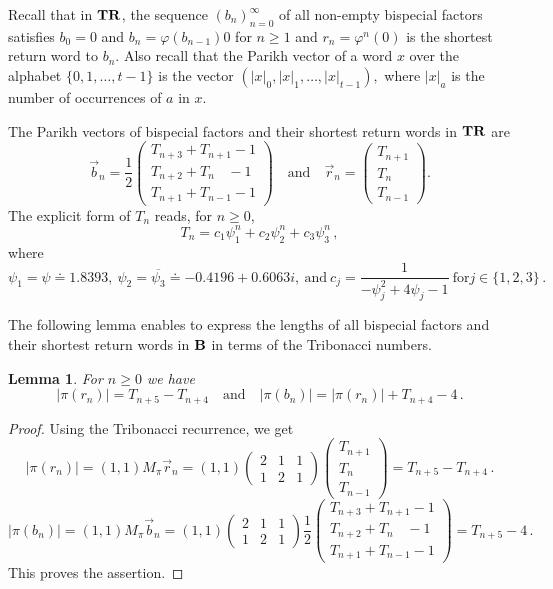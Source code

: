 \documentclass[
final
]{dmtcs-episciences}
\theoremstyle{plain}
\newtheorem{lemma}[theorem]{Lemma}
\theoremstyle{definition}
\theoremstyle{remark}
\begin{document}
Recall that in $\bf TR$, the sequence $(b_n)_{n=0}^{\infty}$ of all non-empty bispecial factors satisfies $b_0=0$ and 
$b_n=\varphi(b_{n-1})0$ for $n\geq 1$ and $r_n=\varphi^n(0)$ is the shortest return word to $b_n$.
Also recall that the Parikh vector of a word $x$ over the alphabet $\{0,1,\ldots, t-1\}$
is the vector
$(|x|_0, |x|_1, \ldots, |x|_{t-1}),$
where $|x|_a$ is the number of occurrences of $a$ in $x$.

The Parikh vectors of bispecial factors and their shortest return words in $\bf TR$ are
\begin{equation}\label{eq: Parikh}
\vec b_n=\frac{1}{2}\left(\begin{array}{c} 
T_{n+3}+T_{n+1}-1\\
T_{n+2}+T_{n\phantom{-1}}-1\\
T_{n+1}+T_{n-1}-1
\end{array}\right) \quad \text{and}\quad \vec r_n=\left(\begin{array}{c} T_{n+1}\\ T_{n\phantom{-1}} \\ T_{n-1}\end{array}\right) . 
\end{equation}
The explicit form of $T_n$ reads, for $n\geq 0$,
\begin{equation}\label{eq: explicit}
T_n=c_1 \psi_1^n+c_2\psi_2^n+c_3\psi_3^n\,,
\end{equation}
where $$\psi_1=\psi\doteq 1.8393, \ \psi_2=\overline{\psi_3}\doteq -0.4196+0.6063i,\ \text{and} \ c_j=\frac{1}{-\psi_j^2+4\psi_j-1}\ \text{for} j\in\{1,2,3\}\,.$$

The following lemma enables to express the lengths of all bispecial factors and their shortest return words in $\bf B$ in terms of the Tribonacci numbers.
\begin{lemma}\label{lem: lengthBS} 
For $n\geq 0$ we have
$$|\pi(r_n)|=T_{n+5}-T_{n+4} \quad \text{and} \quad |\pi(b_n)|=|\pi(r_n)|+T_{n+4}-4\,.$$
\end{lemma}
\begin{proof}
Using the Tribonacci recurrence, we get
$$|\pi(r_n)|=(1,1)M_\pi\vec r_n=(1,1)\left(\begin{array}{rcl} 2&1&1\\ 1&2&1\end{array}\right)\left(\begin{array}{c} T_{n+1}\\ T_{n\phantom{-1}} \\ T_{n-1}\end{array}\right)=T_{n+5}-T_{n+4}\,.$$
$$|\pi(b_n)|=(1,1)M_\pi\vec b_n=(1,1)\left(\begin{array}{rcl} 2&1&1\\ 1&2&1\end{array}\right)\frac{1}{2}\left(\begin{array}{c} 
T_{n+3}+T_{n+1}-1\\
T_{n+2}+T_{n\phantom{-1}}-1\\
T_{n+1}+T_{n-1}-1
\end{array}\right)=T_{n+5}-4\,.$$
This proves the assertion.
\end{proof}
\end{document}
